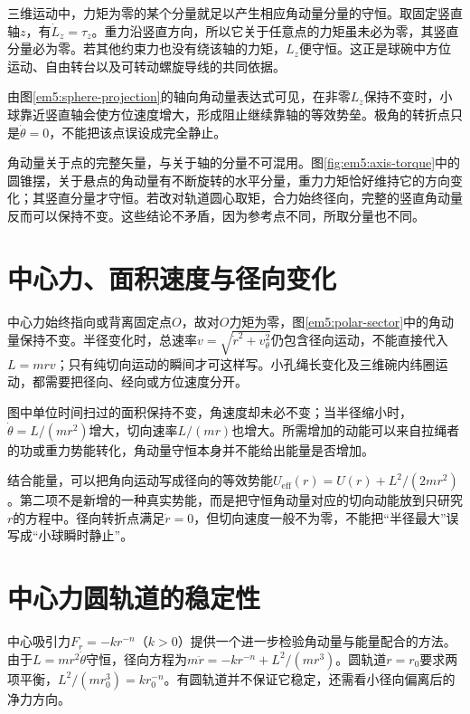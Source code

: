 三维运动中，力矩为零的某个分量就足以产生相应角动量分量的守恒。取固定竖直轴$z$，有$\dot L_z=\tau_z$。重力沿竖直方向，所以它关于任意点的力矩虽未必为零，其竖直分量必为零。若其他约束力也没有绕该轴的力矩，$L_z$便守恒。这正是球碗中方位运动、自由转台以及可转动螺旋导线的共同依据。

由图\ref{em5:sphere-projection}的轴向角动量表达式可见，在非零$L_z$保持不变时，小球靠近竖直轴会使方位速度增大，形成阻止继续靠轴的等效势垒。极角的转折点只是$\dot\theta=0$，不能把该点误设成完全静止。

角动量关于点的完整矢量，与关于轴的分量不可混用。图\ref{fig:em5:axis-torque}中的圆锥摆，关于悬点的角动量有不断旋转的水平分量，重力力矩恰好维持它的方向变化；其竖直分量才守恒。若改对轨道圆心取矩，合力始终径向，完整的竖直角动量反而可以保持不变。这些结论不矛盾，因为参考点不同，所取分量也不同。

\section{中心力、面积速度与径向变化}



中心力始终指向或背离固定点$O$，故对$O$力矩为零，图\ref{em5:polar-sector}中的角动量保持不变。半径变化时，总速率$v=\sqrt{\dot r^2+v_\theta^2}$仍包含径向运动，不能直接代入$L=mrv$；只有纯切向运动的瞬间才可这样写。小孔绳长变化及三维碗内纬圈运动，都需要把径向、经向或方位速度分开。

图中单位时间扫过的面积保持不变，角速度却未必不变；当半径缩小时，$\dot\theta=L/(mr^2)$增大，切向速率$L/(mr)$也增大。所需增加的动能可以来自拉绳者的功或重力势能转化，角动量守恒本身并不能给出能量是否增加。

结合能量，可以把角向运动写成径向的等效势能$U_{\mathrm{eff}}(r)=U(r)+L^2/(2mr^2)$。第二项不是新增的一种真实势能，而是把守恒角动量对应的切向动能放到只研究$r$的方程中。径向转折点满足$\dot r=0$，但切向速度一般不为零，不能把“半径最大”误写成“小球瞬时静止”。

\section{中心力圆轨道的稳定性}

中心吸引力$F_r=-kr^{-n}$（$k>0$）提供一个进一步检验角动量与能量配合的方法。由于$L=mr^2\dot\theta$守恒，径向方程为$m\ddot r=-kr^{-n}+L^2/(mr^3)$。圆轨道$r=r_0$要求两项平衡，$L^2/(mr_0^3)=kr_0^{-n}$。有圆轨道并不保证它稳定，还需看小径向偏离后的净力方向。

